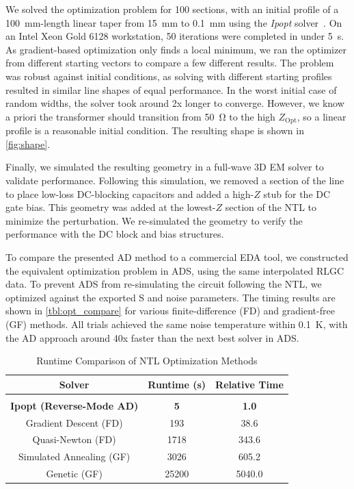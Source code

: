 We solved the optimization problem for \num{100} sections, with an initial profile of a \qty{100}{\mm}-length linear taper from \qty{15}{\mm} to \qty{0.1}{\mm} using the \textit{Ipopt} solver~\cite{wachterImplementationInteriorpointFilter2006}.
On an Intel Xeon Gold 6128 workstation, \num{50} iterations were completed in under \qty{5}{\s}.
As gradient-based optimization only finds a local minimum, we ran the optimizer from different starting vectors to compare a few different results.
The problem was robust against initial conditions, as solving with different starting profiles resulted in similar line shapes of equal performance.
In the worst initial case of random widths, the solver took around 2x longer to converge.
However, we know a priori the transformer should transition from \qty{50}{\ohm} to the high $Z_\text{Opt}$, so a linear profile is a reasonable initial condition.
The resulting shape is shown in \autoref{fig:shape}.

Finally, we simulated the resulting geometry in a full-wave 3D EM solver to validate performance.
Following this simulation, we removed a section of the line to place low-loss DC-blocking capacitors and added a high-$Z$ stub for the DC gate bias.
This geometry was added at the lowest-$Z$ section of the NTL to minimize the perturbation.
We re-simulated the geometry to verify the performance with the DC block and bias structures.

To compare the presented AD method to a commercial EDA tool, we constructed the equivalent optimization problem in ADS, using the same interpolated RLGC data.
To prevent ADS from re-simulating the circuit following the NTL, we optimized against the exported S and noise parameters.
The timing results are shown in \autoref{tbl:opt_compare} for various finite-difference (FD) and gradient-free (GF) methods.
All trials achieved the same noise temperature within \qty{0.1}{\K}, with the AD approach around 40x faster than the next best solver in ADS.

\begin{table}[h!]
    \caption{Runtime Comparison of NTL Optimization Methods}
    \label{tbl:opt_compare}
    \label{table_example}
    \centering
    \begin{tabular}{c c c}
         Solver & Runtime (s) &  Relative Time \\
         \hline& \\[-2.0ex]
         \textbf{Ipopt (Reverse-Mode AD)} & \textbf{5} & \textbf{1.0} \\
         Gradient Descent (FD) & 193 & 38.6 \\
         Quasi-Newton (FD) & 1718 & 343.6 \\
         Simulated Annealing (GF) & 3026 & 605.2  \\
         Genetic (GF) & 25200 & 5040.0 \\
    \end{tabular}
\end{table}

